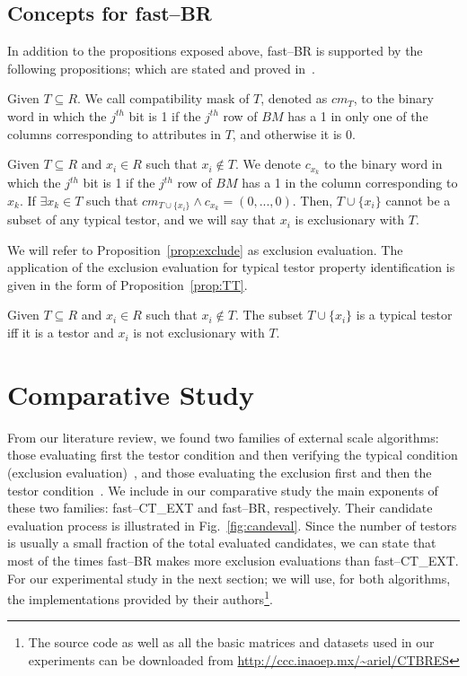 \documentclass[citenumber]{llncs}
\begin{document}
%
\subsection{Concepts for fast--BR}
%
	In addition to the propositions exposed above, fast--BR is supported by the following propositions; which are stated and proved in~\cite{Lias2013}.
	
	\begin{definition}\label{def:exclusion}
		Given $T \subseteq R$. We call compatibility mask of $T$, denoted as $cm_T$, to the binary word in which the $j^{\mathit{th}}$ bit is 1 if the $j^{\mathit{th}}$ row of $BM$ has a 1 in only one of the columns corresponding to attributes in $T$, and otherwise it is 0.
	\end{definition}
	
	\begin{proposition}\label{prop:exclude} 
		Given $T \subseteq R$ and $x_i \in R$ such that $x_i \notin T$.	We denote $c_{x_k}$ to the binary word in which the $j^{\mathit{th}}$ bit is 1 if the $j^{\mathit{th}}$ row of $BM$ has a 1 in the column corresponding to $x_k$. If $\exists x_k \in T$ such that $cm_{T \cup \lbrace x_i\rbrace} \wedge c_{x_k}=(0,...,0)$. Then, $T \cup \lbrace x_i\rbrace$ cannot be a subset of any typical testor, and we will say that $x_i$ is exclusionary with $T$.
	\end{proposition}
	
	We will refer to Proposition~\ref{prop:exclude} as exclusion evaluation. The application of the exclusion evaluation for typical testor property identification is given in the form of Proposition~\ref{prop:TT}.
	
	\begin{proposition}\label{prop:TT} 
			Given $T \subseteq R$ and $x_i \in R$ such that $x_i \notin T$. The subset $T \cup \lbrace x_i\rbrace$ is a typical testor iff it is a testor and $x_i$ is not exclusionary with $T$.
	\end{proposition}
		
%
\section{Comparative Study} \label{study}
%
	  From our literature review, we found two families of external scale algorithms: those evaluating first the testor condition and then verifying the typical condition (exclusion evaluation)~\cite{Shulcloper1982,Sanchez2007,Sanchez2010}, and those evaluating the exclusion first and then the testor condition~\cite{Santiesteban2003,Lias2009,Lias2013}. We include in our comparative study the main exponents of these two families: fast--CT\_EXT and fast--BR, respectively. Their candidate evaluation process is illustrated in Fig.~\ref{fig:candeval}.  Since the number of testors is usually a small fraction of the total evaluated candidates, we can state that most of the times fast--BR makes more exclusion evaluations than fast--CT\_EXT. For our experimental study in the next section; we will use, for both algorithms, the implementations provided by their authors\footnote{The source code as well as all the basic matrices and datasets used in our experiments can be downloaded from \url{http://ccc.inaoep.mx/~ariel/CTBRES}}.
\end{document}
